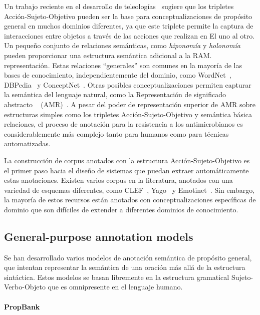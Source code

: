 Un trabajo reciente en el desarrollo de teleologías~\cite{teleologies} sugiere que los tripletes Acción-Sujeto-Objetivo pueden ser la base para conceptualizaciones de propósito general en muchos dominios diferentes, ya que este triplete permite la captura de interacciones entre objetos a través de las acciones que realizan en El uno al otro.
Un pequeño conjunto de relaciones semánticas, como \textit{hiponomía} y \textit{holonomía} pueden proporcionar una estructura semántica adicional a la RAM.
representación. Estas relaciones ``generales'' son comunes en la mayoría de las bases de conocimiento, independientemente del dominio, como WordNet~\cite{miller1998wordnet},
DBPedia~\cite{lehmann2015dbpedia} y ConceptNet~\cite{conceptnet}.
Otras posibles conceptualizaciones permiten capturar la semántica del lenguaje natural, como la Representación de significado abstracto ~ (AMR)~\cite{amr}. A pesar del poder de representación superior de AMR sobre estructuras simples como los tripletes Acción-Sujeto-Objetivo {y semántica básica
relaciones}, el proceso de anotación para la resistencia a los antimicrobianos es considerablemente más complejo tanto para humanos como para técnicas automatizadas.

La construcción de corpus anotados con la estructura Acción-Sujeto-Objetivo es el primer paso hacia el diseño de sistemas que puedan extraer automáticamente estas anotaciones. Existen varios corpus en la literatura, anotados con una variedad de esquemas diferentes, como CLEF~\cite{kelly2016overview}, Yago~\cite{fabian2007yago} y Emotinet~\cite{emotinet}.
Sin embargo, la mayoría de estos recursos están anotados con conceptualizaciones específicas de dominio que son difíciles de extender a diferentes dominios de conocimiento.

\subsection{General-purpose annotation models}\label{sec:general}

Se han desarrollado varios modelos de anotación semántica de propósito general, que intentan representar la semántica de una oración más allá de la estructura sintáctica.
Estos modelos se basan libremente en la estructura gramatical Sujeto-Verbo-Objeto que es omnipresente en el lenguaje humano.

\paragraph{PropBank}

